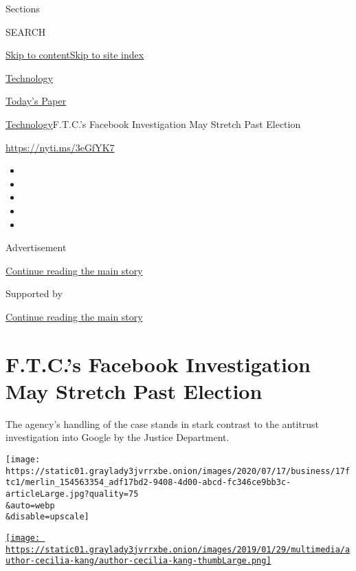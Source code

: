 Sections

SEARCH

\protect\hyperlink{site-content}{Skip to
content}\protect\hyperlink{site-index}{Skip to site index}

\href{https://www.nytimes3xbfgragh.onion/section/technology}{Technology}

\href{https://myaccount.nytimes3xbfgragh.onion/auth/login?response_type=cookie\&client_id=vi}{}

\href{https://www.nytimes3xbfgragh.onion/section/todayspaper}{Today's
Paper}

\href{/section/technology}{Technology}\textbar{}F.T.C.'s Facebook
Investigation May Stretch Past Election

\href{https://nyti.ms/3eGfYK7}{https://nyti.ms/3eGfYK7}

\begin{itemize}
\item
\item
\item
\item
\item
\end{itemize}

Advertisement

\protect\hyperlink{after-top}{Continue reading the main story}

Supported by

\protect\hyperlink{after-sponsor}{Continue reading the main story}

\hypertarget{ftcs-facebook-investigation-may-stretch-past-election}{%
\section{F.T.C.'s Facebook Investigation May Stretch Past
Election}\label{ftcs-facebook-investigation-may-stretch-past-election}}

The agency's handling of the case stands in stark contrast to the
antitrust investigation into Google by the Justice Department.

\texttt{[image: https://static01.graylady3jvrrxbe.onion/images/2020/07/17/business/17ftc1/merlin\_154563354\_adf17bd2-9408-4d00-abcd-fc346ce9bb3c-articleLarge.jpg?quality=75\\\&auto=webp\\\&disable=upscale]}

\href{https://www.nytimes3xbfgragh.onion/by/cecilia-kang}{\texttt{[image: https://static01.graylady3jvrrxbe.onion/images/2019/01/29/multimedia/author-cecilia-kang/author-cecilia-kang-thumbLarge.png]}}

